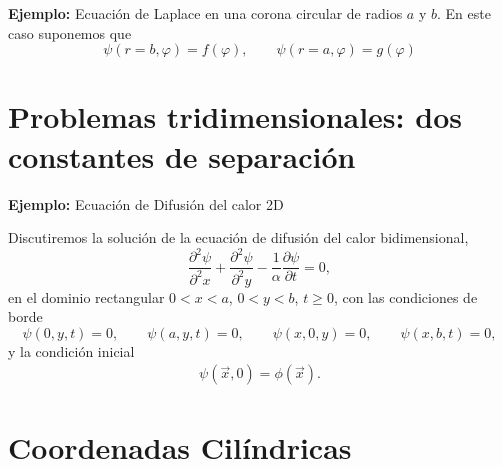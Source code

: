 \textbf{Ejemplo:} Ecuación de Laplace en una corona circular de radios $a$ y $b$. En este caso suponemos que 
\begin{equation}
\psi(r=b,\varphi) = f(\varphi), \qquad \psi(r=a,\varphi) = g(\varphi)
\end{equation}

\section{Problemas tridimensionales: dos constantes de separación}
\textbf{Ejemplo:} Ecuación de Difusión del calor 2D

Discutiremos la solución de la ecuación de difusión del calor bidimensional, 
\begin{equation}
\frac{\partial^2 \psi}{\partial^2 x} + \frac{\partial^2 \psi}{\partial^2 y}-\frac{1}{\alpha}\frac{\partial \psi}{\partial t}=0,
\end{equation}
en el dominio rectangular $0<x<a$, $0<y<b$, $t\ge 0$, con las condiciones de borde
\begin{equation}
\psi(0,y,t)=0, \qquad \psi(a,y,t)=0, \qquad \psi(x,0,y)=0, \qquad \psi(x,b,t)=0,
\end{equation}
y la condición inicial
\begin{align}
\psi(\vec{x},0) = \phi(\vec{x}).
\end{align}
\section{Coordenadas Cil\'indricas}
